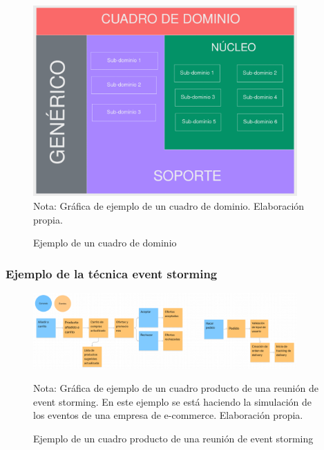   \begin{figure}[H]
    \caption{Ejemplo de un cuadro de dominio}
    \centering
    \includegraphics[width=0.90\textwidth]{src/assets/metodologia/cuadro_dominio}
    \label{fig:cuadro_dominio}
    \\
    Nota: Gráfica de ejemplo de un cuadro de dominio. Elaboración propia.
  \end{figure}


\subsubsection*{Ejemplo de la técnica event storming}
\vspace{1em}

  \begin{figure}[H]
    \caption{Ejemplo de un cuadro producto de una reunión de event storming}
    \begin{center}
    \includegraphics[width=0.90\textwidth]{src/assets/metodologia/event_storming}
    \label{fig:event_storming}
    \end{center}
    Nota: Gráfica de ejemplo de un cuadro producto de una reunión de event storming.
    En este ejemplo se está haciendo la simulación de los eventos de una empresa de e-commerce.
    Elaboración propia.
  \end{figure}


